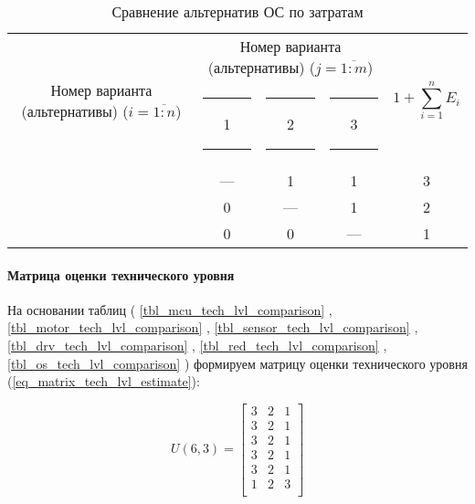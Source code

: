 \begin{table}[H]
    \centering
    \begin{tabular}{|c|c|c|c|c|}
        \hline
        \multirow{2}{2.4cm}[-0.5pc]{
            \centering
            Номер варианта (альтернативы) ($i = \overline{1:n}$)
        } &
        \multicolumn{3}{c|}{
            \parbox[t]{2.4cm}{
                \centering
                Номер варианта (альтернативы) ($j = \overline{1:m}$)
            }
        } &
        \multirow{2}{1.7cm}{
            \centering
            $$1 + \sum_{i=1}^n E_i$$
        } \\
        &
        \centering \rule{2pt}{0pt} 1 \rule{2pt}{0pt} &
        \centering \rule{2pt}{0pt} 2 \rule{2pt}{0pt} &
        \centering \rule{2pt}{0pt} 3 \rule{2pt}{0pt} & \\
        \hline \hline
        \centering{1} &---& 1 & 1 & 3 \\ \hline
        \centering{2} & 0 &---& 1 & 2 \\ \hline
        \centering{3} & 0 & 0 &---& 1 \\ \hline
    \end{tabular}
    \caption{Сравнение альтернатив ОС по затратам}
    \label{tbl_os_cost_lvl_comparison}
\end{table}


\paragraph{Матрица оценки технического уровня}

На основании таблиц (
    \ref{tbl_mcu_tech_lvl_comparison}
  , \ref{tbl_motor_tech_lvl_comparison}
  , \ref{tbl_sensor_tech_lvl_comparison}
  , \ref{tbl_drv_tech_lvl_comparison}
  , \ref{tbl_red_tech_lvl_comparison}
  , \ref{tbl_os_tech_lvl_comparison}
)
формируем матрицу оценки технического уровня
(\ref{eq_matrix_tech_lvl_estimate}):

\begin{equation}
    U(6,3) =
    \begin{bmatrix}
        3 & 2 & 1 \\
        3 & 2 & 1 \\
        3 & 2 & 1 \\
        3 & 2 & 1 \\
        3 & 2 & 1 \\
        1 & 2 & 3 \\
    \end{bmatrix}
    \label{eq_matrix_tech_lvl_estimate}
\end{equation}

